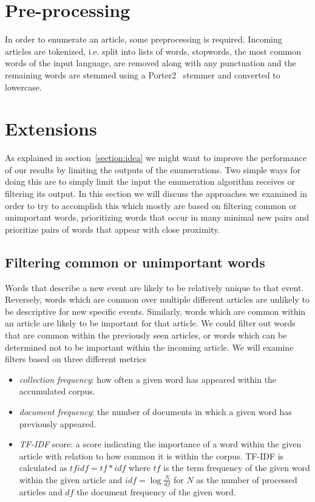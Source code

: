 \section{Pre-processing}
\label{method:preprocessing}
In order to enumerate an article, some preprocessing is required. Incoming articles are tokenized, i.e. split into lists of words, stopwords, the most common words of the input language, are removed along with any punctuation and the remaining words are stemmed using a Porter2~\cite{porter2002english} stemmer and converted to lowercase.

\section{Extensions}
As explained in section~\ref{section:idea} we might want to improve the performance of our results by limiting the outputs of the enumerations. Two simple ways for doing this are to simply limit the input the enumeration algorithm receives or filtering its output.
In this section we will discuss the approaches we examined in order to try to accomplish this which mostly are based on filtering common or unimportant words, prioritizing words that occur in many minimal new pairs and prioritize pairs of words that appear with close proximity.

\subsection{Filtering common or unimportant words}
Words that describe a new event are likely to be relatively unique to that event. Reversely, words which are common over multiple different articles are unlikely to be descriptive for new specific events. Similarly, words which are common within an article are likely to be important for that article. We could filter out words that are common within the previously seen articles, or words which can be determined not to be important within the incoming article. We will examine filters based on three different metrics
\begin{itemize}
  \item \emph{collection frequency}: how often a given word has appeared within the accumulated corpus.
  \item \emph{document frequency}: the number of documents in which a given word has previously appeared.
  \item \emph{TF-IDF} score: a score indicating the importance of a word within the given article with relation to how common it is within the corpus. TF-IDF is calculated as $tfidf = tf*idf$ where $tf$ is the term frequency of the given word within the given article and $idf = \log{\frac{N}{df}}$ for $N$ as the number of processed articles and $df$ the document frequency of the given word.
\end{itemize}

